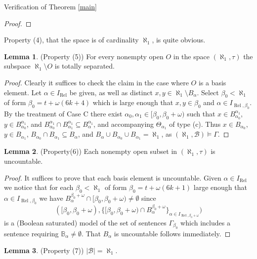\documentclass{amsart}
\theoremstyle{definition}\newtheorem{theorem}{Theorem}
\theoremstyle{definition}\newtheorem{bigtheorem}{Theorem}
\numberwithin{theorem}{section}
\theoremstyle{definition}\newtheorem{corollary}[theorem]{Corollary}
\theoremstyle{definition}\newtheorem{proposition}[theorem]{Proposition}
\theoremstyle{definition}\newtheorem{definition}[theorem]{Definition}
\theoremstyle{definition}\newtheorem{question}[theorem]{Question}
\theoremstyle{definition}\newtheorem{example}[theorem]{Example}
\theoremstyle{definition}\newtheorem{remark}[theorem]{Remark}
\theoremstyle{definition}\newtheorem{note}[theorem]{Note}
\theoremstyle{definition}\newtheorem{lemma}[theorem]{Lemma}
\theoremstyle{definition}\newtheorem{fact}[theorem]{Fact}
\theoremstyle{definition}\newtheorem{define}[theorem]{Definition}
\theoremstyle{definition}\newtheorem{definitions}[theorem]{Definitions}
\theoremstyle{definition}\newtheorem{claim}[theorem]{Claim}
\theoremstyle{definition}\newtheorem{obs}[theorem]{Observation}
\theoremstyle{definition}\newtheorem{construction}[theorem]{Construction}
\newcommand{\B}{\mathbb{B}}
\newcommand{\Rel}{\operatorname{Rel}}
\newcommand{\Bo}{\mathcal{B}}
\begin{document}
\begin{section}{Verification of Theorem \ref{main}}
\begin{proof}
\end{proof}

Property (4), that the space is of cardinality $\aleph_1$, is quite obvious.

\begin{lemma} \label{separatesindeed}(Property (5))  For every nonempty open $O$ in the space $(\aleph_1, \tau)$ the subspace $\aleph_1 \setminus O$ is totally separated.
\end{lemma}

\begin{proof}  Clearly it suffices to check the claim in the case where $O$ is a basis element.  Let $\alpha \in I_{\Rel}$ be given, as well as distinct $x, y \in \aleph_1 \setminus B_{\alpha}$.  Select $\beta_0 < \aleph_1$ of form $\beta_0 = t + \omega(6k + 4)$ which is large enough that $x, y \in \beta_0$ and $\alpha \in I_{\Rel, \beta_0}$.  By the treatment of Case C there exist $\alpha_0, \alpha_1 \in [\beta_0, \beta_0 + \omega)$ such that $x \in B_{\alpha_0}^{\alpha_1}$, $y\in B_{\alpha_0}^{\alpha_1}$, and $B_{\alpha_0}^{\alpha_1} \cap B_{\alpha_1}^{\alpha_1} \subseteq B_{\alpha}^{\alpha_1}$, and accompanying $\Theta_{\alpha_1}$ of type (c).  Thus $x \in B_{\alpha_0}$, $y\in B_{\alpha_1}$, $B_{\alpha_0} \cap B_{\alpha_1} \subseteq B_{\alpha}$, and $B_{\alpha} \cup B_{\alpha_0} \cup B_{\alpha_1} = \aleph_1$, as $(\aleph_1, \Bo) \models \Gamma$.
\end{proof}


\begin{lemma} \label{bigopensindeed}  (Property(6)) Each nonempty open subset in $(\aleph_1, \tau)$ is uncountable.
\end{lemma}

\begin{proof}  It suffices to prove that each basis element is uncountable.  Given $\alpha \in I_{\Rel}$ we notice that for each $\beta_0 < \aleph_1$ of form $\beta_0 = t + \omega(6k + 1)$ large enough that $\alpha \in I_{\Rel, \beta_0}$ we have $B_{\alpha}^{\beta_0 + \omega} \cap [\beta_0, \beta_0 + \omega) \neq \emptyset$ since $$([\beta_0, \beta_0 + \omega) , \{[\beta_0, \beta_0 + \omega) \cap B_{\alpha}^{\beta_0 + \omega}\}_{\alpha \in I_{\Rel, \beta_0 + \omega}})$$ is a (Boolean saturated) model of the set of sentences $\Gamma_{\beta_0}$ which includes a sentence requiring $\B_{\alpha} \neq \emptyset$.  That $B_{\alpha}$ is uncountable follows immediately.
\end{proof}

\begin{lemma}  \label{uncountablebasisindeed}(Property (7)) $|\Bo| = \aleph_1$.
\end{lemma}


\end{section}
\end{document}
